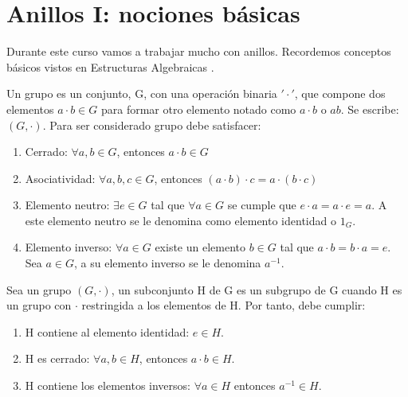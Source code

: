 \chapter{Anillos I: nociones básicas}



Durante este curso vamos a trabajar mucho con anillos. Recordemos conceptos básicos vistos en Estructuras Algebraicas \cite{apuntesEA}.


\begin{defn}[Grupo]
Un grupo es un conjunto, G, con una operación binaria $'\cdot'$, que compone dos elementos $a \cdot b \in G$ para formar otro elemento notado como $a \cdot b$ o $ab$. Se escribe: $(G,\cdot)$. Para ser considerado grupo debe satisfacer:
\begin{enumerate}
	\item Cerrado: $\forall a,b \in G$, entonces $a \cdot b \in G$
	\item Asociatividad: $\forall a,b,c \in G$, entonces $(a\cdot b) \cdot c = a \cdot (b \cdot c)$
	\item Elemento neutro: $\exists e \in G$ tal que $\forall a \in G$ se cumple que $e\cdot a=a\cdot e = a$. A este elemento neutro se le denomina como elemento identidad o $1_G$.
	\item Elemento inverso: $\forall a \in G$ existe un elemento $b \in G$ tal que $a \cdot b = b \cdot a = e$. Sea $a \in G$, a su elemento inverso se le denomina $a^{-1}$.
\end{enumerate}
\end{defn}

\begin{defn}[Subgrupo]
Sea un grupo  $(G,\cdot)$, un subconjunto H de G es un subgrupo de G cuando H es un grupo con $\cdot$ restringida a los elementos de H. Por tanto, debe cumplir:
\begin{enumerate}
	\item H contiene al elemento identidad: $e \in H$.
	\item H es cerrado: $\forall a,b \in H$, entonces $a \cdot b \in H$.
	\item H contiene los elementos inversos: $\forall a \in H$ entonces $a^{-1} \in H$.
\end{enumerate}
\end{defn}

